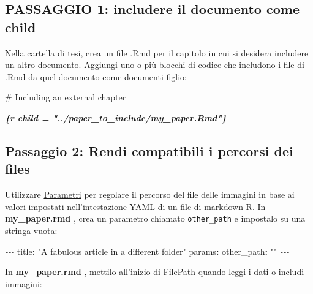 \documentclass[a4paper, 11pt, nobind]{templates/ociamthesis}
\newenvironment{Shaded}{\begin{snugshade}}{\end{snugshade}}
\newcommand{\AttributeTok}[1]{\textcolor[rgb]{0.77,0.63,0.00}{#1}}
\newcommand{\FunctionTok}[1]{\textcolor[rgb]{0.00,0.00,0.00}{#1}}
\newcommand{\InformationTok}[1]{\textcolor[rgb]{0.56,0.35,0.01}{\textbf{\textit{#1}}}}
\newcommand{\KeywordTok}[1]{\textcolor[rgb]{0.13,0.29,0.53}{\textbf{#1}}}
\newcommand{\PreprocessorTok}[1]{\textcolor[rgb]{0.56,0.35,0.01}{\textit{#1}}}
\newcommand{\StringTok}[1]{\textcolor[rgb]{0.31,0.60,0.02}{#1}}
\renewenvironment{Shaded}
{
  \vspace{10pt}%
  \begin{snugshade}%
}{%
  \end{snugshade}%
  \vspace{8pt}%
}
\begin{document}
\hypertarget{passaggio-1-includere-il-documento-come-child}{%
\subsection{PASSAGGIO 1: includere il documento come child}\label{passaggio-1-includere-il-documento-come-child}}

Nella cartella di tesi, crea un file .Rmd per il capitolo in cui si desidera includere un altro documento.
Aggiungi uno o più blocchi di codice che includono i file di .Rmd da quel documento come documenti figlio:

\begin{Shaded}
\begin{Highlighting}[]
\FunctionTok{\# Including an external chapter }

\InformationTok{\textasciigrave{}\textasciigrave{}\textasciigrave{}\{r child = "../paper\_to\_include/my\_paper.Rmd"\}}
\InformationTok{\textasciigrave{}\textasciigrave{}\textasciigrave{}}
\end{Highlighting}
\end{Shaded}

\hypertarget{passaggio-2-rendi-compatibili-i-percorsi-dei-files}{%
\subsection{Passaggio 2: Rendi compatibili i percorsi dei files}\label{passaggio-2-rendi-compatibili-i-percorsi-dei-files}}

Utilizzare \href{https://rmarkdown.studio.com/lesson-6.html}{Parametri} per regolare il percorso del file delle immagini in base ai valori impostati nell'intestazione YAML di un file di markdown R.
In \textbf{my\_paper.rmd }, crea un parametro chiamato \texttt{other\_path} e impostalo su una stringa vuota:

\begin{Shaded}
\begin{Highlighting}[]
\PreprocessorTok{{-}{-}{-}}
\FunctionTok{title}\KeywordTok{:}\AttributeTok{ }\StringTok{"A fabulous article in a different folder"}
\FunctionTok{params}\KeywordTok{:}
\AttributeTok{  }\FunctionTok{other\_path}\KeywordTok{:}\AttributeTok{ }\StringTok{""}
\PreprocessorTok{{-}{-}{-}}
\end{Highlighting}
\end{Shaded}

In \textbf{my\_paper.rmd }, mettilo all'inizio di FilePath quando leggi i dati o includi immagini:
\end{document}
